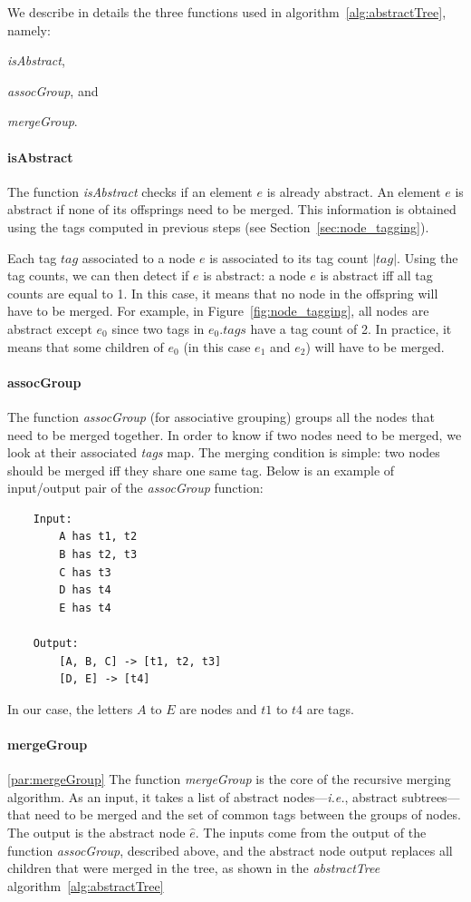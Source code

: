\documentclass[sigconf,authordraft]{acmart}
\theoremstyle{definition}
\begin{document}
We describe in details the three functions used in algorithm~\ref{alg:abstractTree}, namely:
\begin{inparaenum}
  \item \emph{isAbstract},
  \item \emph{assocGroup}, and
  \item \emph{mergeGroup}.
\end{inparaenum}

\paragraph{isAbstract}
The function \emph{isAbstract} checks if an element $e$ is already abstract.
An element $e$ is abstract if none of its offsprings need to be merged.
This information is obtained using the tags computed in previous steps (see Section~\ref{sec:node_tagging}).

Each tag $tag$ associated to a node $e$ is associated to its tag count $|tag|$.
Using the tag counts, we can then detect if $e$ is abstract: a node $e$ is abstract iff all tag counts are equal to 1.
In this case, it means that no node in the offspring will have to be merged.
For example, in Figure~\ref{fig:node_tagging}, all nodes are abstract except $e_{0}$ since two tags in $e_{0}.tags$ have a tag count of 2.
In practice, it means that some children of $e_{0}$ (in this case $e_{1}$ and $e_{2}$) will have to be merged.

\paragraph{assocGroup}\label{par:assocGroup}
The function \emph{assocGroup} (for associative grouping) groups all the nodes that need to be merged together.
In order to know if two nodes need to be merged, we look at their associated \emph{tags} map.
The merging condition is simple: two nodes should be merged iff they share one same tag.
Below is an example of input/output pair of the \emph{assocGroup} function:
\begin{lstlisting}
    Input:
        A has t1, t2
        B has t2, t3
        C has t3
        D has t4
        E has t4

    Output:
        [A, B, C] -> [t1, t2, t3]
        [D, E] -> [t4]
\end{lstlisting}

In our case, the letters $A$ to $E$ are nodes and $t1$ to $t4$ are tags.

\paragraph{mergeGroup}\ref{par:mergeGroup}
The function \emph{mergeGroup} is the core of the recursive merging algorithm.
As an input, it takes a list of abstract nodes---\emph{i.e.}, abstract subtrees---that need to be merged and the set of common tags between the groups of nodes.
The output is the abstract node $\hat{e}$.
The inputs come from the output of the function \emph{assocGroup}, described above, and the abstract node output replaces all children that were merged in the tree, as shown in the \emph{abstractTree} algorithm~\ref{alg:abstractTree}
\end{document}
